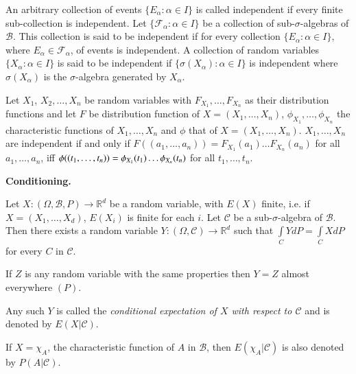 An arbitrary collection of events $\{E_{\alpha}:\alpha \in I\}$ is
called independent if every finite sub-collection is independent. Let
$\{\mathscr{F}_{\alpha}:\alpha\in I\}$ be a collection of
sub-$\sigma$-algebras of $\mathscr{B}$. This collection is said to be
independent if for every collection $\{E_{\alpha}:\alpha \in I\}$,
where $E_{\alpha}\in \mathscr{F}_{\alpha}$, of events is
independent. A collection of random variables $\{X_{\alpha}:\alpha\in
I\}$ is said to be independent if $\{\sigma(X_{\alpha}):\alpha\in I\}$
is independent where $\sigma(X_{\alpha})$ is the $\sigma$-algebra
generated by $X_{\alpha}$.

\begin{theorem*}
Let $X_{1}$, $X_{2},\ldots,X_{n}$ be random variables with
$F_{X_{1}},\ldots,F_{X_{n}}$ as their distribution functions and let
$F$ be distribution function of $X=(X_{1},\ldots,X_{n})$,
$\phi_{X_{1}},\ldots,\phi_{X_{n}}$ the characteristic functions of
$X_{1},\ldots,X_{n}$ and $\phi$ that of
$X=(X_{1},\ldots,X_{n})$. $X_{1},\ldots,X_{n}$ are independent if and
only if $F((a_{1},\ldots,a_{n}))=F_{X_{1}}(a_{1})\ldots
F_{X_{n}}(a_{n})$ for all $a_{1},\ldots,a_{n}$, iff
$\phi((t_{1},\ldots,t_{n}))\break =\phi_{X_{1}}(t_{1})\ldots\phi_{X_{n}}(t_{n})$\pageoriginale
for all $t_{1},\ldots,t_{n}$. 
\end{theorem*}


\noindent
{\bf Conditioning.}

\begin{theorem*}
Let $X:(\Omega,\mathscr{B},P)\to \mathbb{R}^{d}$ be a random variable, with
$E(X)$ finite, i.e. if $X=(X_{1},\ldots,X_{d})$, $E(X_{i})$ is finite
for each $i$. Let $\mathscr{C}$ be a sub-$\sigma$-algebra of
$\mathscr{B}$. Then there exists a random variable
$Y:(\Omega,\mathscr{C})\to \mathbb{R}^{d}$ such that
$\int\limits_{C}YdP=\int\limits_{C}XdP$ for every $C$ in
$\mathscr{C}$.

If $Z$ is any random variable with the same properties then $Y=Z$
almost everywhere $(P)$.
\end{theorem*}

\begin{defi*}
Any such $Y$ is called the {\em conditional expectation of $X$ with
  respect to $\mathscr{C}$} and is denoted by $E(X|\mathscr{C})$.

If $X=\chi_{A}$, the characteristic function of $A$ in $\mathscr{B}$,
then $E(\chi_{A}|\mathscr{C})$ is also denoted by $P(A|\mathscr{C})$.
\end{defi*}

